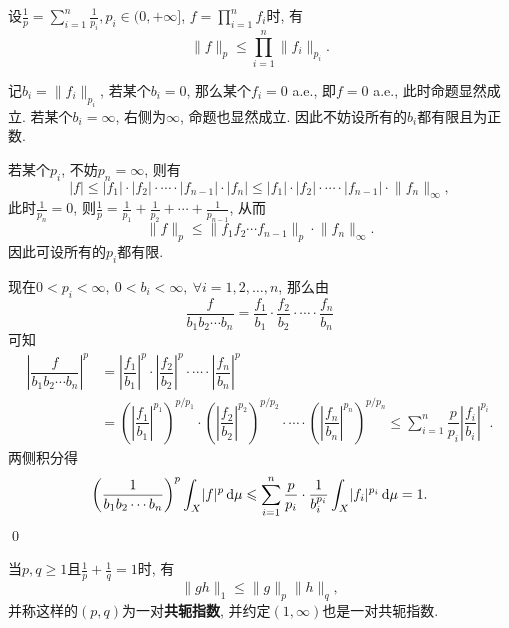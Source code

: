 \begin{Proposition}[H\"older]
	设$ \frac{1}{p}=\sum\limits_{i=1}^n\frac{1}{p_i}, p_{i}\in(0, +\infty] $, $ f=\prod\limits_{i=1}^nf_i $时, 有
	\[
		\lVert f\rVert_p\leqslant\prod_{i=1}^n\lVert f_i\rVert_{p_i}.
	\]
\end{Proposition}
\begin{Proof}
	记$ b_i=\lVert f_i\rVert_{p_i} $, 若某个$ b_i=0 $, 那么某个$ f_i=0 $ a.e., 即$ f=0 $ a.e., 此时命题显然成立. 若某个$ b_i=\infty $, 右侧为$ \infty $, 命题也显然成立. 因此不妨设所有的$ b_i $都有限且为正数.

	若某个$ p_i $, 不妨$ p_n=\infty $, 则有
	\[
		\lvert f\rvert\leqslant\lvert f_1\rvert\cdot\lvert f_2\rvert\cdot\cdots\cdot\lvert f_{n-1}\rvert\cdot\lvert f_n\rvert\leqslant \lvert f_1\rvert\cdot\lvert f_2\rvert\cdot\cdots\cdot\lvert f_{n-1}\rvert\cdot\lVert f_n\rVert_\infty,
	\]
	此时$ \frac{1}{p_n}=0 $, 则$ \frac{1}{p}=\frac{1}{p_1}+\frac{1}{p_2}+\cdots+\frac{1}{p_{n-1}} $, 从而
	\[
		\lVert f\rVert_p\leqslant\lVert f_1f_2\cdots f_{n-1}\rVert_p\cdot\lVert f_n\rVert_\infty.
	\]
	因此可设所有的$ p_i $都有限.

	现在$ 0<p_i<\infty,\ 0<b_i<\infty,\ \forall i=1,2, \dots,n $, 那么由
	\[
		\dfrac{f}{b_1b_2\cdots b_n}=\dfrac{f_1}{b_1}\cdot\dfrac{f_2}{b_2}\cdot\cdots\cdot\dfrac{f_n}{b_n}
	\]
	可知
	\begin{align*}
		\left| \dfrac{f}{b_1b_2\cdots b_n} \right|^p & =\left| \dfrac{f_1}{b_1} \right|^p\cdot\left| \dfrac{f_2}{b_2} \right|^p\cdot\cdots\cdot\left| \dfrac{f_n}{b_n} \right|^p                                                                                                                                                     \\
		                                             & =\left(\left| \dfrac{f_1}{b_1} \right|^{p_1}\right)^{p/p_1}\cdot\left(\left| \dfrac{f_2}{b_2} \right|^{p_2}\right)^{p/p_2}\cdot\cdots\cdot\left(\left| \dfrac{f_n}{b_n} \right|^{p_n}\right)^{p/p_n}\leqslant\sum_{i=1}^n\dfrac{p}{p_i}\left| \dfrac{f_i}{b_i} \right|^{p_i}.
	\end{align*}
	两侧积分得
	\[
		\left(\dfrac{1}{b_1b_2\cdots b_n}\right)^p\int_X\lvert f\rvert^p\,\mathrm{d}\mu\leqslant\sum_{i=1}^n\dfrac{p}{p_i}\cdot\dfrac{1}{b_i^{p_i}}\int_X\lvert f_i\rvert^{p_i}\,\mathrm{d}\mu=1.
	\]\qed
\end{Proof}

\begin{Corollary}[H\"older]
	当$ p,q\geqslant 1 $且$ \frac{1}{p}+\frac{1}{q}=1 $时, 有
	\[
		\lVert gh\rVert_1\leqslant\lVert g\rVert_p\lVert h\rVert_q,
	\]
	并称这样的$ (p,q) $为一对\textbf{共轭指数}, 并约定$ (1,\infty) $也是一对共轭指数.
\end{Corollary}


